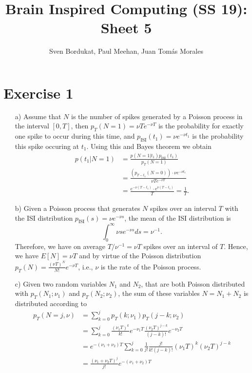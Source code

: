 \documentclass{scrartcl}
\title{Brain Inspired Computing (SS 19): Sheet 5}
\author{Sven Bordukat, Paul Meehan, Juan Tomás Morales}
\date{}
\begin{document}
    \maketitle
    \section*{Exercise 1}
    \begin{itemize}
        \item[a)] Assume that $N$ is the number of spikes generated by a Poisson process in the interval $[0,T]$, then $ p_T(N=1) = \nu Te^{-\nu T} $ is the probability for exactly one spike to occur during this time, and $ p_\text{ISI}(t_1) = \nu e^{-\nu t_1} $ is the probability this spike occuring at $t_1$. Using this and Bayes theorem we obtain
        \begin{align*}
            p(t_1|N=1) &= \frac{p(N=1|t_1)p_\text{ISI}(t_1)}{p_T(N=1)} \\
            &= \frac{(p_{T-t_1}(N=0))\cdot \nu e^{-\nu t_1}}{\nu Te^{-\nu T}} \\
            &= \frac{e^{-\nu(T - t_1)}\cdot e^{\nu(T - t_1)}}{T} = \frac{1}{T}.
        \end{align*}
        \item[b)] Given a Poisson process that generates $N$ spikes over an interval $T$ with the ISI distribution $p_\text{ISI}(s) = \nu e^{-\nu s}$, the mean of the ISI distribution is $$ \int_0^{\infty} \nu se^{-\nu s}ds = \nu^{-1}. $$ Therefore, we have on average $T/\nu^{-1} = \nu T$ spikes over an interval of $T$. Hence, we have $E[N] = \nu T$ and by virtue of the Poisson distribution $p_T(N) = \frac{(\nu T)^N}{N!}e^{-\nu T}$, i.e., $\nu$ is the rate of the Poisson process.
        \item[c)] Given two random variables $N_1$ and $N_2$, that are both Poisson distributed with $p_T(N_1;\nu_1)$ and $p_T(N_2;\nu_2)$, the sum of these variables $N=N_1+N_2$ is distributed according to \begin{align*}
            p_T(N=j,\nu) &= \sum_{k=0}^j p_T(k;\nu_1)p_T(j-k;\nu_2) \\
            &= \sum_{k=0}^j \frac{(\nu_1 T)^k}{k!}e^{-\nu_1 T}\frac{(\nu_2 T)^{j-k}}{(j-k)!}e^{-\nu_2 T} \\
            &= e^{-(\nu_1+\nu_2)T}\sum_{k=0}^j \frac{1}{j!}\frac{j!}{k!(j-k)!}(\nu_1T)^k(\nu_2T)^{j-k} \\
            &= \frac{(\nu_1+\nu_2 T)^j}{j!}e^{-(\nu_1+\nu_2) T}
        \end{align*}

\end{itemize}
\end{document}
